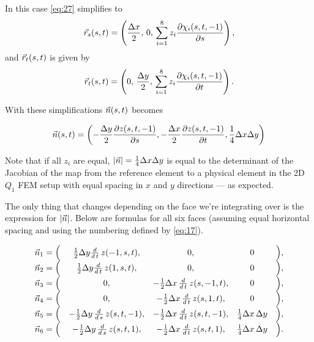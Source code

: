 \documentclass[11pt]{article}
\begin{document}
In this case \eqref{eq:27} simplifies to
\begin{equation}
  \label{eq:29}
  \vec r_{s}(s,t) = \left(
    \frac{\Delta x}{2},\,
    0,\,
    \sum_{i=1}^{8} z_{i} \frac{\partial \chi_{i}(s, t, -1)}{\partial s} \right),
\end{equation}
and $\vec r_{t}(s,t)$ is given by
\begin{equation}
  \label{eq:30}
  \vec r_{t}(s,t) = \left(
    0,\,
    \frac{\Delta y}{2},\,
    \sum_{i=1}^{8} z_{i} \frac{\partial \chi_{i}(s, t, -1)}{\partial t} \right).
\end{equation}

With these simplifications $\vec n(s,t)$ becomes

\begin{equation}
  \label{eq:31}
  \vec n(s,t) = \left(
    -\frac{\Delta y}{2}\frac{\partial z(s,t,-1)}{\partial s},
    -\frac{\Delta x}{2}\frac{\partial z(s,t,-1)}{\partial t},
    \frac{1}{4} \Delta x \Delta y
  \right)
\end{equation}

Note that if all $z_{i}$ are equal, $|\vec n| = \frac{1}{4} \Delta x \Delta y$ is
equal to the determinant of the Jacobian of the map from the reference
element to a physical element in the 2D $Q_{1}$ FEM setup with equal
spacing in $x$ and $y$ directions --- as expected.

The only thing that changes depending on the face we're integrating
over is the expression for $|\vec n|$. Below are formulas for all six
faces (assuming equal horizontal spacing and using the numbering
defined by \eqref{eq:17}).

\newcommand{\ddt}{\frac{d}{d\,t}}
\newcommand{\dds}{\frac{d}{d\,s}}
\begin{align*}
  \begin{array}{rcccl}
    \N_{1} = \Big( & \frac{1}{2}\dy\ddt\,z(-1 , s , t),& 0 ,& 0 & \Big) , \\
    \N_{2} = \Big( & \frac{1}{2}\dy\ddt\,z(1 , s , t),& 0 ,& 0 & \Big) , \\
    \N_{3} = \Big( & 0 ,& -\frac{1}{2}\dx\,\ddt\,z(s , -1 , t),& 0 & \Big) , \\
    \N_{4} = \Big( & 0 ,& -\frac{1}{2}\dx\,\ddt\,z(s , 1 , t),& 0 & \Big) , \\
    \N_{5} = \Big( & -\frac{1}{2}\dy\,\dds\,z(s , t , -1) ,& -\frac{1}{2}\dx\,\ddt\,z(s , t , -1) ,& \frac{1}{4}\dx\,\dy & \Big) , \\
    \N_{6} = \Big( & -\frac{1}{2}\dy\,\dds\,z(s , t , 1) ,& -\frac{1}{2}\dx\,\ddt\,z(s , t , 1) ,& \frac{1}{4}\dx\,\dy & \Big) . \\
  \end{array}
\end{align*}
\end{document}
